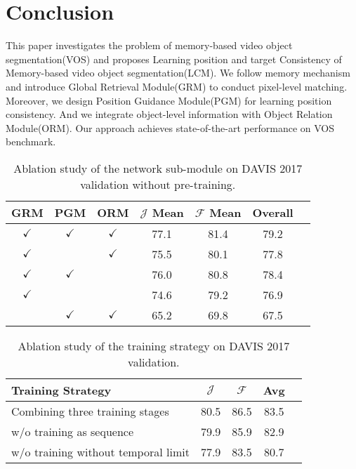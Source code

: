 \documentclass[final]{cvpr}
\begin{document}
\section{Conclusion}
This paper investigates the problem of memory-based video object segmentation(VOS) and proposes Learning position and target Consistency of Memory-based video object segmentation(LCM). We follow memory mechanism and introduce Global Retrieval Module(GRM) to conduct pixel-level matching. Moreover, we design Position Guidance Module(PGM) for learning position consistency. And we integrate object-level information with Object Relation Module(ORM). Our approach achieves state-of-the-art performance on VOS benchmark.






\begin{table}
	\centering
	\begin{center}
\begin{tabular}{ccccccc} 

\hline
 GRM & PGM & ORM & $\mathcal{J}$ Mean & $\mathcal{F}$ Mean & Overall \\
 \hline
  $\checkmark$ & $\checkmark$ & $\checkmark$ & 77.1 & 81.4 & 79.2 \\
 \hline
  $\checkmark$ &  & $\checkmark$ & 75.5 & 80.1 & 77.8\\
  $\checkmark$ & $\checkmark$ &  & 76.0 & 80.8 & 78.4\\
  $\checkmark$ &  &  & 74.6 & 79.2 & 76.9\\
 & $\checkmark$ & $\checkmark$ & 65.2 & 69.8 & 67.5\\
 
\hline
\end{tabular}
\end{center} 	\caption{Ablation study of the network sub-module on DAVIS 2017 validation without pre-training.}
	\label{table:ablation1}
\end{table}

\begin{table}
	\centering
	\begin{center}
\begin{tabular}{lcccc} 

\hline
Training Strategy & $\mathcal{J}$  & $\mathcal{F}$  & Avg \\
 \hline
Combining three training stages & 80.5 & 86.5 & 83.5 \\
 \hline
 w/o training as sequence  & 79.9 & 85.9 & 82.9\\
w/o training without temporal limit  & 77.9 & 83.5 & 80.7\\
 
\hline
\end{tabular}
\end{center} 	\caption{Ablation study of the training strategy on DAVIS 2017 validation.}
	\label{table:ablation2}
\end{table}
\end{document}
